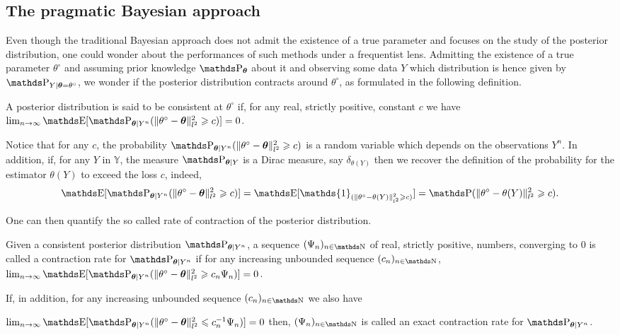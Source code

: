 \subsection{The pragmatic Bayesian approach}\label{INTRO_BAYES_PRAGMATIC}
Even though the traditional Bayesian approach does not admit the existence of a true parameter and focuses on the study of the posterior distribution, one could wonder about the performances of such methods under a frequentist lens.
Admitting the existence of a true parameter $\theta^{\circ}$ and assuming prior knowledge $\P_{\boldsymbol{\theta}}$ about it and observing some data $Y$ which distribution is hence given by $\P_{Y \vert \boldsymbol{\theta} = \theta^{\circ}}$, we wonder if the posterior distribution contracts around $\theta^{\circ}$, as formulated in the following definition.

\begin{de}
A posterior distribution is said to be consistent at $\theta^{\circ}$ if, for any real, strictly positive, constant $c$ we have
$\lim_{n \rightarrow \infty} \E[\P_{\boldsymbol{\theta} \vert Y^{n}}(\Vert \theta^{\circ} - \boldsymbol{\theta} \Vert_{l^{2}}^{2} \geq c)] = 0$.
\assEnd
\end{de}

Notice that for any $c$, the probability $\P_{\boldsymbol{\theta} \vert Y^{n}}(\Vert \theta^{\circ} - \boldsymbol{\theta} \Vert_{l^{2}}^{2} \geq c)$ is a random variable which depends on the observations $Y^{n}$.
In addition, if, for any $Y$ in $\mathds{Y}$, the measure $\P_{\boldsymbol{\theta} \vert Y}$ is a Dirac measure, say $\delta_{\theta(Y)}$ then we recover the definition of the probability for the estimator $\theta(Y)$ to exceed the loss $c$, indeed,
\[\E[\P_{\boldsymbol{\theta} \vert Y^{n}}(\Vert \theta^{\circ} - \boldsymbol{\theta} \Vert_{l^{2}}^{2} \geq c)] = \E[\mathds{1}_{(\Vert \theta^{\circ} - \theta(Y) \Vert_{l^{2}}^{2} \geq c)}] = \P(\Vert \theta^{\circ} - \theta(Y) \Vert_{l^{2}}^{2} \geq c).\]

One can then quantify the so called rate of contraction of the posterior distribution.

\begin{de}
Given a consistent posterior distribution $\P_{\boldsymbol{\theta} \vert Y^{n}}$, a sequence $(\Psi_{n})_{n \in \N}$ of real, strictly positive, numbers, converging to $0$ is called a contraction rate for $\P_{\boldsymbol{\theta} \vert Y^{n}}$ if for any increasing unbounded sequence $(c_{n})_{n \in \N}$, $\lim_{n \rightarrow \infty}\E[\P_{\boldsymbol{\theta} \vert Y^{n}}(\Vert \theta^{\circ} - \boldsymbol{\theta} \Vert_{l^{2}}^{2} \geq c_{n} \Psi_{n})] = 0$.

If, in addition, for any increasing unbounded sequence $(c_{n})_{n \in \N}$ we also have

$\lim_{n \rightarrow \infty}\E[\P_{\boldsymbol{\theta} \vert Y^{n}}(\Vert \theta^{\circ} - \boldsymbol{\theta} \Vert_{l^{2}}^{2} \leq c_{n}^{-1} \Psi_{n})] = 0$ then, $(\Psi_{n})_{n \in \N}$ is called an exact contraction rate for $\P_{\boldsymbol{\theta} \vert Y^{n}}$.
\assEnd
\end{de}


